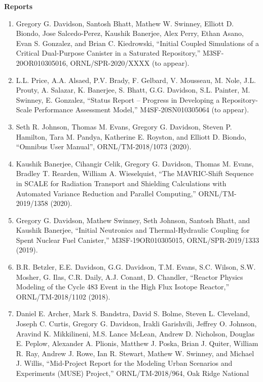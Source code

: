 \documentclass[letterpaper,11pt]{article}
\newcommand{\leftsubheading}[1]{
  \textbf{#1\vspace{-6pt} \\}}
\begin{document}
\leftsubheading{Reports}
\begin{enumerate}
  \item Gregory G. Davidson, Santosh Bhatt, Mathew W. Swinney,
    Elliott D. Biondo, Jose Salcedo-Perez, Kaushik Banerjee, Alex
    Perry, Ethan Asano, Evan S. Gonzalez, and Brian C. Kiedrowski,
    ``Initial Coupled Simulations of a Critical Dual-Purpose Canister
    in a Saturated Repository,'' M3SF-20OR010305016,
    ORNL/SPR-2020/XXXX (to appear).
  \item L.L. Price, A.A. Alsaed, P.V. Brady, F. Gelbard, V. Mousseau,
    M. Nole, J.L. Prouty, A. Salazar, K. Banerjee, S. Bhatt,
    G.G. Davidson, S.L. Painter, M. Swinney, E. Gonzalez, ``Status
    Report -- Progress in Developing a Repository-Scale Performance
    Assessment Model,'' M4SF-20SN010305064 (to appear).
  \item Seth R. Johnson, Thomas M. Evans, Gregory G. Davidson, Steven
    P. Hamilton, Tara M. Pandya, Katherine E. Royston, and Elliott
    D. Biondo, ``Omnibus User Manual'', ORNL/TM-2018/1073 (2020).
  \item Kaushik Banerjee, Cihangir Celik, Gregory G. Davidson,
    Thomas M. Evans, Bradley T. Rearden, William A. Wieselquist,
    ``The MAVRIC-Shift Sequence in SCALE for Radiation Transport and
    Shielding Calculations with Automated Variance Reduction and
    Parallel Computing,'' ORNL/TM-2019/1358 (2020).
  \item Gregory G. Davidson, Mathew Swinney, Seth Johnson, Santosh
    Bhatt, and Kaushik Banerjee, ``Initial Neutronics and
    Thermal-Hydraulic Coupling for Spent Nuclear Fuel Canister,''
    M3SF-19OR010305015, ORNL/SPR-2019/1333 (2019).
  \item B.R. Betzler, E.E. Davidson, G.G. Davidson, T.M. Evans,
    S.C. Wilson, S.W. Mosher, G. Ilas, C.R. Daily, A.J. Conant,
    D. Chandler, ``Reactor Physics Modeling of the Cycle 483 Event
    in the High Flux Isotope Reactor,'' ORNL/TM-2018/1102 (2018).
  \item Daniel E. Archer, Mark S. Bandstra, David S. Bolme, Steven
    L. Cleveland, Joseph C. Curtis, Gregory G. Davidson, Irakli
    Garishvili, Jeffrey O. Johnson, Aravind K. Mikkilineni, M.S. Lance
    McLean, Andrew D. Nicholson, Douglas E. Peplow, Alexander
    A. Plionis, Matthew J. Poska, Brian J. Quiter, William R. Ray,
    Andrew J. Rowe, Ian R. Stewart, Mathew W. Swinney, and Michael
    J. Willis, ``Mid-Project Report for the Modeling Urban Scenarios and
    Experiments (MUSE) Project,'' ORNL/TM-2018/964, Oak Ridge National

\end{enumerate}
\end{document}
